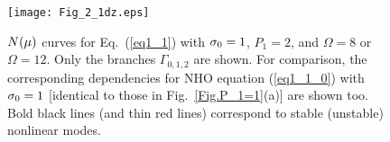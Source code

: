 \documentclass[aps,preprint,showkeys,
]{revtex4}
\begin{document}


\begin{figure}[tbp]
\texttt{[image: Fig\_2\_1dz.eps]}%
\caption{$N(\protect\mu )$ curves for Eq.~(\protect\ref{eq1_1}) with $%
\protect\sigma _{0}=1$, $P_{1}=2$, and $\Omega =8$ or $\Omega =12$. Only the
branches $\Gamma _{0,1,2}$ are shown. For comparison, the corresponding
dependencies for NHO equation (\protect\ref{eq1_1_0}) with $\protect\sigma %
_{0}=1$ [identical to those in Fig.~\protect\ref{Fig.P_1=1}(a)] are shown
too. Bold black lines (and thin red lines) correspond to stable (unstable)
nonlinear modes.}
\label{FigP_1ne_0}
\end{figure}

\end{document}
